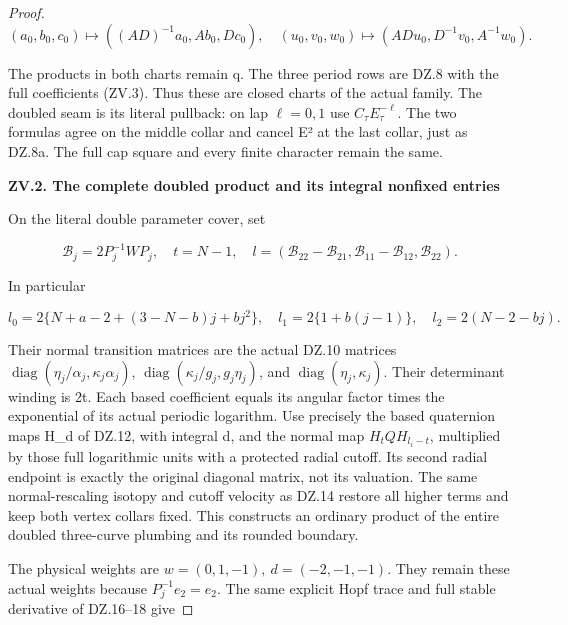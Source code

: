 \begin{proof}
\[
 (a_0,b_0,c_0)\mapsto((AD)^{-1}a_0,Ab_0,Dc_0),
 \quad(u_0,v_0,w_0)\mapsto(ADu_0,D^{-1}v_0,A^{-1}w_0).
                                                        \tag{ZV.4}
\]

The products in both charts remain q. The three period rows are
DZ.8 with the full coefficients (ZV.3). Thus these are closed charts
of the actual family. The doubled seam is its literal pullback:
on lap \(\ell=0,1\) use \(C_\tau E_\tau^{-\ell}\). The two formulas agree on the
middle collar and cancel E² at the last collar, just as DZ.8a.
The full cap square and every finite character remain the same.

\par

\medskip\noindent\textbf{ZV.2. The complete doubled product and its integral nonfixed entries}

\par\nopagebreak[4]

On the literal double parameter cover, set

\[
 \mathcal B_j=2P_j^{-1}WP_j,
 \quad t=N-1,
 \quad l=(\mathcal B_{22}-\mathcal B_{21},
          \mathcal B_{11}-\mathcal B_{12},\mathcal B_{22}).
                                                        \tag{ZV.5}
\]

In particular

\[
 l_0=2\{N+a-2+(3-N-b)j+bj^2\},\quad
 l_1=2\{1+b(j-1)\},\quad l_2=2(N-2-bj).
                                                        \tag{ZV.6}
\]

Their normal transition matrices are the actual DZ.10 matrices
\(\operatorname{diag}(\eta_j/\alpha_j,\kappa_j\alpha_j)\),
\(\operatorname{diag}(\kappa_j/g_j,g_j\eta_j)\), and \(\operatorname{diag}(\eta_j,\kappa_j)\).
Their determinant winding is 2t. Each based coefficient equals its
angular factor times the exponential of its actual periodic logarithm.
Use precisely the based quaternion maps H\_d of DZ.12, with integral
d, and the normal map \(H_t Q H_{l_i-t}\), multiplied by those full
logarithmic units with a protected radial cutoff. Its second radial
endpoint is exactly the original diagonal matrix, not its valuation.
The same normal-rescaling isotopy and cutoff velocity as DZ.14
restore all higher terms and keep both vertex collars fixed. This
constructs an ordinary product of the entire doubled three-curve
plumbing and its rounded boundary.

The physical weights are \(w=(0,1,-1),\ d=(-2,-1,-1)\). They remain
these actual weights because \(P_j^{-1}e_2=e_2\). The same explicit Hopf
trace and full stable derivative of DZ.16--18 give


\end{proof}
